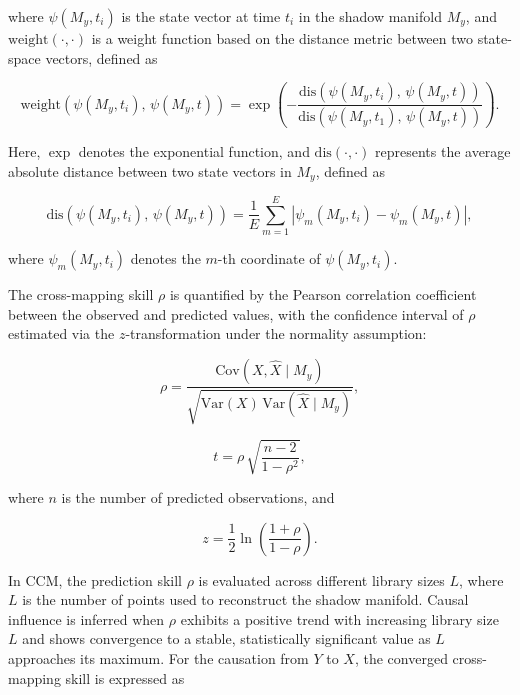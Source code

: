 \documentclass[authoryear,preprint,review,12pt]{elsarticle}
\begin{document}
\noindent where $\psi(M_y, t_i)$ is the state vector at time $t_i$ in the shadow manifold $M_y$, and $\mathrm{weight}(\cdot,\cdot)$ is a weight function based on the distance metric between two state-space vectors, defined as

\begin{equation}\label{eq_ccm_weight_fun}
\mathrm{weight} \left( \psi(M_y, t_i),\, \psi(M_y, t) \right) =
\exp \left( - \frac{ \mathrm{dis} \left( \psi(M_y, t_i),\, \psi(M_y, t) \right) }{ \mathrm{dis} \left( \psi(M_y, t_1),\, \psi(M_y, t) \right) } \right).
\end{equation}

\noindent Here, $\exp$ denotes the exponential function, and $\mathrm{dis}(\cdot,\cdot)$ represents the average absolute distance between two state vectors in $M_y$, defined as

\begin{equation}\label{eq_ccm_distance}
\mathrm{dis} \left( \psi(M_y, t_i),\, \psi(M_y, t) \right) = \frac{1}{E} \sum_{m=1}^{E} \left| \psi_m(M_y, t_i) - \psi_m(M_y, t) \right|,
\end{equation}

\noindent where $\psi_m(M_y, t_i)$ denotes the $m$-th coordinate of $\psi(M_y, t_i)$.

The cross-mapping skill $\rho$ is quantified by the Pearson correlation coefficient between the observed and predicted values, with the confidence interval of $\rho$ estimated via the $z$-transformation under the normality assumption:

\begin{equation}\label{eq_ccm_rho}
\rho = \frac{\mathrm{Cov}\left( X, \hat{X} \mid M_y \right)}{ \sqrt{\mathrm{Var}(X) \, \mathrm{Var}\left( \hat{X} \mid M_y \right) } },
\end{equation}

\begin{equation}\label{eq_ccm_tstat}
t = \rho \, \sqrt{\frac{n - 2}{1 - \rho^2}}, 
\end{equation}

\noindent where $n$ is the number of predicted observations, and

\begin{equation}\label{eq_ccm_zstat}
z = \frac{1}{2} \ln \left( \frac{1 + \rho}{1 - \rho} \right).
\end{equation}

In CCM, the prediction skill $\rho$ is evaluated across different library sizes $L$, where $L$ is the number of points used to reconstruct the shadow manifold. Causal influence is inferred when $\rho$ exhibits a positive trend with increasing library size $L$ and shows convergence to a stable, statistically significant value as $L$ approaches its maximum. For the causation from $Y$ to $X$, the converged cross-mapping skill is expressed as
\end{document}
